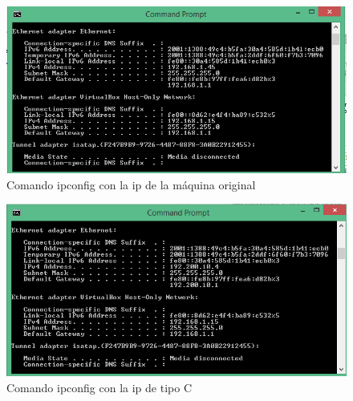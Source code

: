 \documentclass[a4paper,12pt]{article}
\begin{document}
 \begin{figure}[H]
  \centering
  \includegraphics[scale = 0.5]{7.png}
  \caption{Comando ipconfig con la ip de la máquina original}
 \end{figure}
 
 \begin{figure}[H]
  \centering
  \includegraphics[scale = 0.5]{8.png}
  \caption{Comando ipconfig con la ip de tipo C}
 \end{figure}
 
\end{document}
